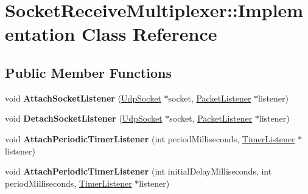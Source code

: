 \hypertarget{class_socket_receive_multiplexer_1_1_implementation}{}\section{Socket\+Receive\+Multiplexer\+:\+:Implementation Class Reference}
\label{class_socket_receive_multiplexer_1_1_implementation}
\subsection*{Public Member Functions}
\begin{DoxyCompactItemize}
\item 
\mbox{\label{class_socket_receive_multiplexer_1_1_implementation_a132a2e748001a9e2d555751181fe8782}} 
void {\bfseries Attach\+Socket\+Listener} (\hyperlink{class_udp_socket}{Udp\+Socket} $\ast$socket, \hyperlink{class_packet_listener}{Packet\+Listener} $\ast$listener)
\item 
\mbox{\label{class_socket_receive_multiplexer_1_1_implementation_a811808862a4766ba3bc5a5d46394bf4c}} 
void {\bfseries Detach\+Socket\+Listener} (\hyperlink{class_udp_socket}{Udp\+Socket} $\ast$socket, \hyperlink{class_packet_listener}{Packet\+Listener} $\ast$listener)
\item 
\mbox{\label{class_socket_receive_multiplexer_1_1_implementation_a71f803e1a50079c94552bc6f5d9278d5}} 
void {\bfseries Attach\+Periodic\+Timer\+Listener} (int period\+Milliseconds, \hyperlink{class_timer_listener}{Timer\+Listener} $\ast$listener)
\item 
\mbox{\label{class_socket_receive_multiplexer_1_1_implementation_a0b1dabf90c37f7b9e4c5aa88fd49f8eb}} 
void {\bfseries Attach\+Periodic\+Timer\+Listener} (int initial\+Delay\+Milliseconds, int period\+Milliseconds, \hyperlink{class_timer_listener}{Timer\+Listener} $\ast$listener)
\item 
\mbox{\label{class_socket_receive_multiplexer_1_1_implementation_a2357bf2e75148272bc42b3bc1c2ea2df}} 

\end{DoxyCompactItemize}
